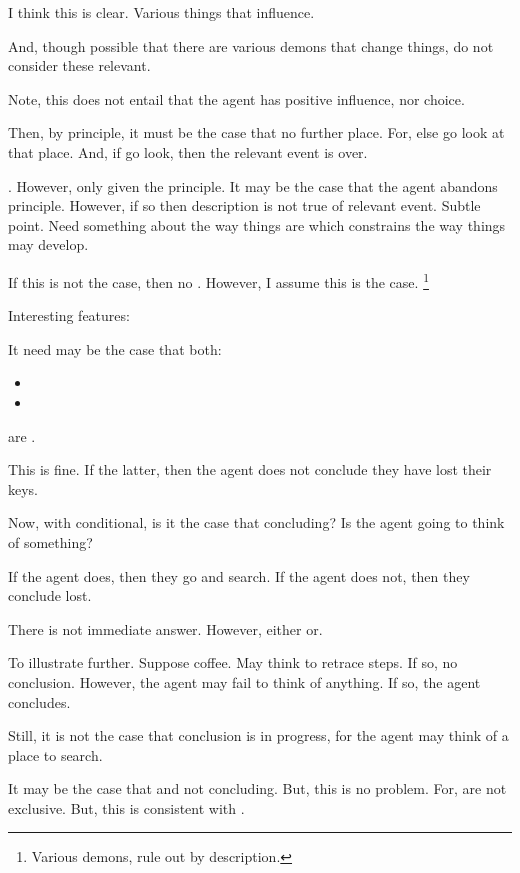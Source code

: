 \begin{note}
{    I think this is clear.
    Various things that influence.

    And, though possible that there are various demons that change things, do not consider these relevant.

    Note, this does not entail that the agent has positive influence, nor choice.
  }
  Then, by principle, it must be the case that no further place.
  For, else go look at that place.
  And, if go look, then the relevant event is over.

  .
  However, only given the principle.
  It may be the case that the agent abandons principle.
  However, if so then description is not true of relevant event.
  Subtle point.
  Need something about the way things are which constrains the way things may develop.

  If this is not the case, then no .
  However, I assume this is the case.%
  \footnote{
    Various demons, rule out by description.
  }
\end{note}

\begin{note}
  Interesting features:

  \begin{observation}
    It need may be the case that both:
    \begin{itemize}
    \item
    \item
    \end{itemize}
    are .
  \end{observation}

  This is fine.
  If the latter, then the agent does not conclude they have lost their keys.

  Now, with conditional, is it the case that concluding?
  Is the agent going to think of something?

  If the agent does, then they go and search.
  If the agent does not, then they conclude lost.

  There is not immediate answer.
  However, either or.

  To illustrate further.
  Suppose coffee.
  May think to retrace steps.
  If so, no conclusion.
  However, the agent may fail to think of anything.
  If so, the agent concludes.

  Still, it is not the case that conclusion is in progress, for the agent may think of a place to search.

  It may be the case that \fc{} and not concluding.
  But, this is no problem.
  For,  are not exclusive.
  But, this is consistent with \requ{}.
\end{note}

